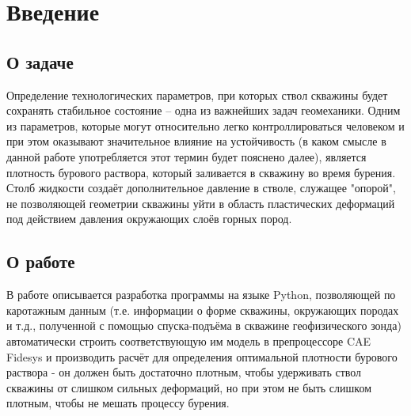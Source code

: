 \documentclass[a4paper,14pt]{scrartcl}
\begin{document}



\tableofcontents


\newpage
\section{Введение}
\subsection{О задаче}
Определение технологических параметров, при которых ствол скважины будет сохранять стабильное состояние – одна из важнейших задач геомеханики. Одним из параметров, которые могут относительно легко контроллироваться человеком и при этом оказывают значительное влияние на устойчивость (в каком смысле в данной работе употребляется этот термин будет пояснено далее), является плотность бурового раствора, который заливается в скважину во время бурения. Столб жидкости создаёт дополнительное давление в стволе, служащее "опорой", не позволяющей геометрии скважины уйти в область пластических деформаций под действием давления окружающих слоёв горных пород. 

\subsection{О работе}
В работе описывается разработка программы на языке Python, позволяющей по каротажным данным (т.е. информации о форме скважины, окружающих породах и т.д., полученной с помощью спуска-подъёма в скважине геофизического зонда) автоматически строить соответствующую им модель в препроцессоре CAE Fidesys и производить расчёт для определения оптимальной плотности бурового раствора - он должен быть достаточно плотным, чтобы удерживать ствол скважины от слишком сильных деформаций, но при этом не быть слишком плотным, чтобы не мешать процессу бурения.


\newpage
\end{document}
